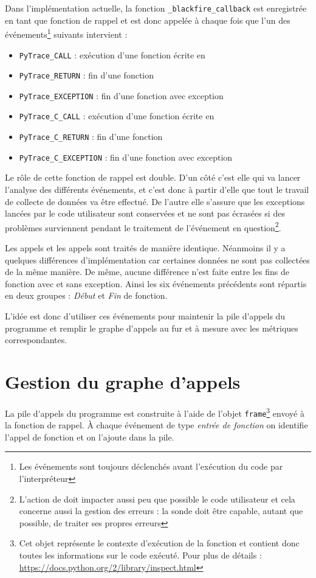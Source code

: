 Dans l'implémentation actuelle, la fonction \C \verb|_blackfire_callback| est enregistrée en tant que fonction de rappel et est donc appelée à chaque fois que l'un des événements\footnote{Les événements sont toujours déclenchés avant l'exécution du code par l'interpréteur} suivants intervient :
\begin{itemize}
\item \verb|PyTrace_CALL| : exécution d'une fonction écrite en \Python
\item \verb|PyTrace_RETURN| : fin d'une fonction \Python
\item \verb|PyTrace_EXCEPTION| : fin d'une fonction \Python avec exception
\item \verb|PyTrace_C_CALL| : exécution d'une fonction écrite en \C
\item \verb|PyTrace_C_RETURN| : fin d'une fonction \C
\item \verb|PyTrace_C_EXCEPTION| : fin d'une fonction \C avec exception
\end{itemize}

Le rôle de cette fonction de rappel est double. D'un côté c'est elle qui va lancer l'analyse des différents événements, et c'est donc à partir d'elle que tout le travail de collecte de données va être effectué. De l'autre elle s'assure que les exceptions lancées par le code utilisateur sont conservées et ne sont pas écrasées si des problèmes surviennent pendant le traitement de l'événement en question\footnote{L'action de \Blackfire doit impacter aussi peu que possible le code utilisateur et cela concerne aussi la gestion des erreurs : la sonde doit être capable, autant que possible, de traiter ses propres erreurs}.

Les appels \C et les appels \Python sont traités de manière identique. Néanmoins il y a quelques différences d'implémentation car certaines données ne sont pas collectées de la même manière. De même, aucune différence n'est faite entre les fins de fonction avec et sans exception. Ainsi les six événements précédents sont répartis en deux groupes : \emph{Début} et \emph{Fin} de fonction.

L'idée est donc d'utiliser ces événements pour maintenir la \gls{pile d'appels} du programme et remplir le \gls{graphe d'appels} au fur et à mesure avec les métriques correspondantes.

  \section{Gestion du graphe d'appels}
  \label{sec:gestion-graph-appels}
La \gls{pile d'appels} du programme est construite à l'aide de l'objet \verb|frame|\footnote{Cet objet représente le contexte d'exécution de la fonction et contient donc toutes les informations sur le code exécuté. Pour plus de détails : \url{https://docs.python.org/2/library/inspect.html}} envoyé à la fonction de rappel. À chaque événement de type \emph{entrée de fonction} on identifie l'appel de fonction et on l'ajoute dans la pile.
  
